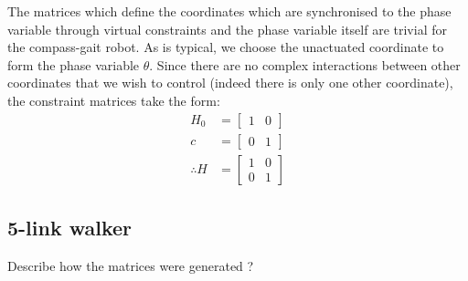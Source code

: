 The matrices which define the coordinates which are synchronised to the phase variable through virtual constraints and the phase variable itself are trivial for the compass-gait robot. As is typical, we choose the unactuated coordinate to form the phase variable $\theta$. Since there are no complex interactions between other coordinates that we wish to control (indeed there is only one other coordinate), the constraint matrices take the form:
\begin{align*}
	H_0 &= \begin{bmatrix}
		1 & 0
	\end{bmatrix} \\
	c &= \begin{bmatrix}
		0 & 1
	\end{bmatrix}\\
	\therefore H &= \begin{bmatrix}
		1 & 0 \\ 0 & 1
	\end{bmatrix}
\end{align*}

{\color{orange}\subsection{5-link walker}
Describe how the matrices were generated \cite{westervelt2007feedback}?}